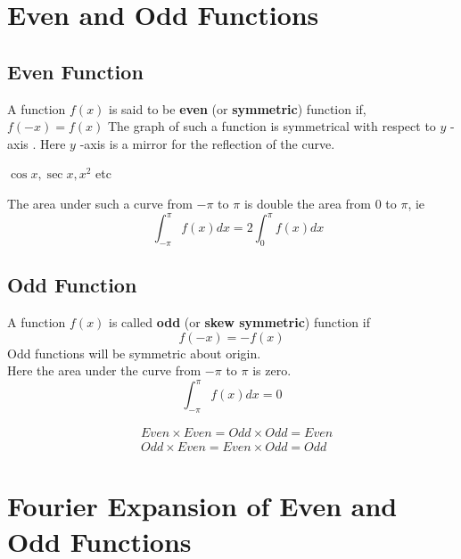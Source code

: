 \section{Even and Odd Functions}
\subsection{Even Function}
A function $f(x)$ is said to be \textbf{even} (or \textbf{symmetric}) function if, $f(-x)=f(x)$ The graph of such a function is symmetrical with respect to $y$ -axis . Here $y$ -axis is a mirror for the reflection of the curve.
\begin{example}
	$\cos x,\sec x ,x^2$ etc

\end{example}
The area under such a curve from $-\pi$ to $\pi$ is double the area from 0 to $\pi$, ie\\
$$\quad \int_{-\pi}^{\pi} f(x) d x=2 \int_{0}^{\pi} f(x) d x$$
\subsection{Odd Function}
A function $f(x)$ is called \textbf{odd} (or \textbf{skew symmetric}) function if
$$
f(-x)=-f(x)
$$ Odd functions will be symmetric about origin.\\
Here the area under the curve from $-\pi$ to $\pi$ is zero.
$$
\int_{-\pi}^{\pi} f(x) d x=0
$$

\begin{note}
	\[
	\boxed{
		\!\begin{aligned}
		&Even \times Even= Odd \times Odd = Even\\
		&Odd \times Even= Even \times Odd = Odd
		\end{aligned}
	}
	\]
\end{note}
\section{Fourier Expansion of Even and Odd Functions}
